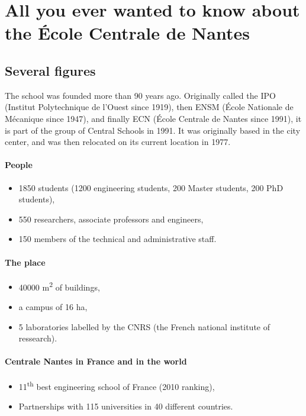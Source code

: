 
\section{All you ever wanted to know about the École Centrale de Nantes}
\subsection{Several figures}
The school was founded more than 90 years ago.
Originally called the IPO (Institut Polytechnique de l'Ouest since 1919), then ENSM (École Nationale de Mécanique since 1947), and finally ECN (École Centrale de Nantes since 1991), it is part of the group of Central Schools in 1991.
It was originally based in the city center, and was then relocated on its current location in 1977.

\paragraph{People}
\begin{itemize}
  \item 1850 students (1200 engineering students, 200 Master students, 200 PhD students),
  \item 550 researchers, associate professors and engineers,
  \item 150 members of the technical and administrative staff.
\end{itemize}
\paragraph{The place}
\begin{itemize}
  \item 40000 m\textsuperscript{2} of buildings,
  \item a campus of 16 ha,
  \item 5 laboratories labelled by the CNRS (the French national institute of ressearch).
\end{itemize}
\paragraph{Centrale Nantes in France and in the world}
\begin{itemize}
  \item 11\textsuperscript{th} best engineering school of France (2010 ranking),
  \item Partnerships with 115 universities in 40 different countries.
\end{itemize}

